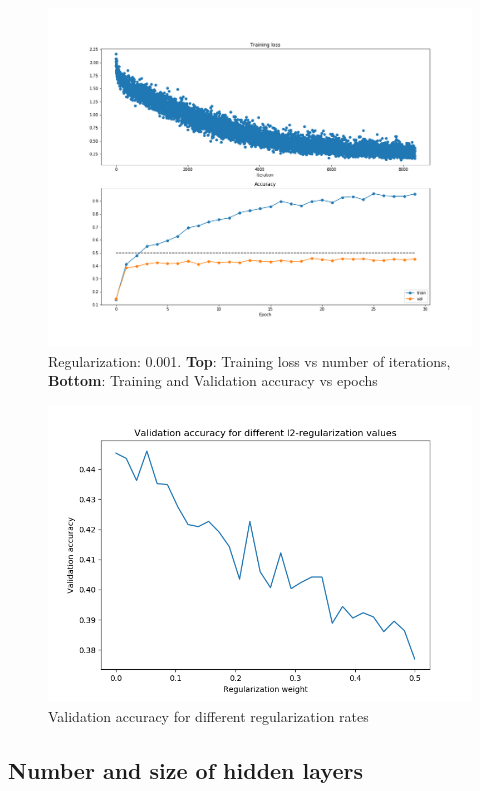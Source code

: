 \documentclass[12pt,twoside]{article}
\begin{document}
\begin{figure}[!htbp]
\centering %
\includegraphics[width = 0.8\hsize]{./figures/reg_0_001.png} %
\caption{Regularization: 0.001. \textbf{Top}: Training loss vs number of iterations, \textbf{Bottom}: Training and Validation accuracy vs epochs} %
\label{reg0_001}
\end{figure}

\begin{figure}[!htbp]
\centering %
\includegraphics[width = 0.8\hsize]{./figures/regul_val_accuracy.png} %
\caption{Validation accuracy for different regularization rates} %
\label{regul_val_acc}
\end{figure}

\newpage
\subsection{Number and size of hidden layers}
\end{document}
